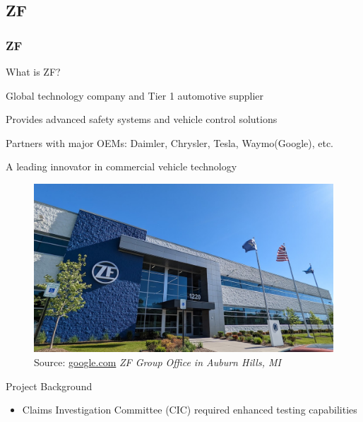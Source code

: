 \documentclass[8pt,compress]{beamer}
\begin{document}
\subsection{ZF}
\begin{frame}
  \frametitle{ZF}
  \begin{minipage}{0.45\textwidth}
    \begin{block}{What is ZF?}
      \begin{itemize}
          \small {
            \item Global technology company and Tier 1 automotive supplier
            \item Provides advanced safety systems and vehicle control solutions
            \item Partners with major OEMs: Daimler, Chrysler, Tesla, Waymo(Google), etc.
            \item A leading innovator in commercial vehicle technology
          }
      \end{itemize}
    \end{block}
  \end{minipage}
  \hfill
  \begin{minipage}{0.45\textwidth}
    \begin{figure}
      \includegraphics[width=\textwidth]{assets/misc/zf-office.jpg}
      \caption{Source: \href{google.com}{google.com}\hspace{\textwidth}
      \textit{ZF Group Office in Auburn Hills, MI}}
    \end{figure}
  \end{minipage}
  \begin{block}{Project Background}
    \begin{itemize}
        \item Claims Investigation Committee (CIC) required enhanced testing capabilities

\end{itemize}
\end{block}
\end{frame}
\end{document}
